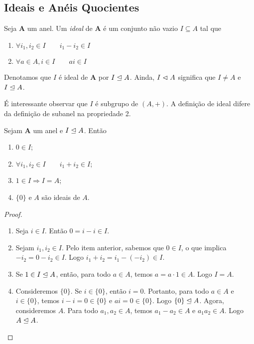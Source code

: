 \subsection{Ideais e Anéis Quocientes}

\begin{defi}
	Seja $\bm A$ um anel. Um \emph{ideal} de $\bm A$ é um conjunto não vazio $I \subseteq A$ tal que
	\begin{enumerate}
	\item $\forall i_1,i_2 \in I \qquad i_1 - i_2 \in I$
	\item $\forall a \in A, i \in I \qquad ai \in I$
	\end{enumerate}
Denotamos que $I$ é ideal de $\bm A$ por $I \mathrel{\unlhd} A$. Ainda, $I \mathrel{\lhd} A$ significa que $I \neq A$ e $I \mathrel{\unlhd} A$.
\end{defi}

	É interessante observar que $I$ é subgrupo de $(A,+)$. A definição de ideal difere da definição de subanel na propriedade 2.

\begin{prop}
	Sejam $\bm A$ um anel e $I \mathrel{\unlhd} A$. Então
	\begin{enumerate}
	\item $0 \in I$;
	\item $\forall i_1,i_2 \in I \qquad i_1 + i_2 \in I$;
	\item $1 \in I \Rightarrow I=A$;
	\item $\{0\}$ e $A$ são ideais de $A$.
	\end{enumerate}
\end{prop}
\begin{proof}
	\begin{enumerate}
	\item Seja $i \in I$. Então $0 = i-i \in I$.
	\item Sejam $i_1,i_2 \in I$. Pelo item anterior, sabemos que $0 \in I$, o que implica $-i_2 = 0 - i_2 \in I$. Logo $i_1 + i_2 = i_1 - (-i_2) \in I$.
	\item Se $1 \in I \mathrel{\unlhd} A$, então, para todo $a \in A$, temos $a=a\cdot1 \in A$. Logo $I=A$.
	\item Consideremos $\{0\}$. Se $i \in \{0\}$, então $i=0$. Portanto, para todo $a \in A$ e $i \in \{0\}$, temos $i-i=0 \in \{0\}$ e $ai=0 \in \{0\}$. Logo $\{0\} \mathrel{\unlhd} A$. Agora, consideremos $A$. Para todo $a_1,a_2 \in A$, temos $a_1-a_2 \in A$ e $a_1a_2 \in A$. Logo $A \mathrel{\unlhd} A$.
	\end{enumerate}
\end{proof}

